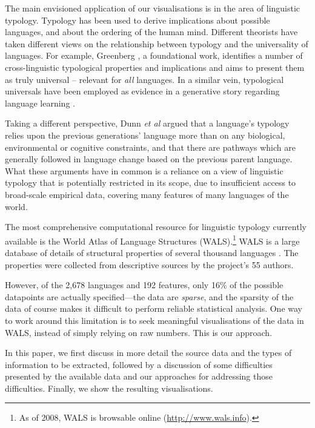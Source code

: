\documentclass[11pt]{article}
\begin{document}
The main envisioned application of our visualisations is in the area of linguistic typology. Typology has been used to derive implications about possible languages, and about the ordering of the human mind. Different theorists have taken different views on the relationship between typology and the universality of languages. For example, Greenberg , a foundational work, identifies a number of cross-linguistic typological properties and implications and aims to present them as truly universal -- relevant for \textit{all} languages. In a similar vein, typological universals have been employed as evidence in a generative story regarding language learning \cite{chomsky}.

Taking a different perspective, Dunn {\it et al}  argued that a language's typology relies upon the previous generations' language more than on any biological, environmental or cognitive constraints, and that there are pathways which are generally followed in language change based on the previous parent language. What these arguments have in common is a reliance on a view of linguistic typology that is potentially restricted in its scope, due to insufficient access to broad-scale empirical data, covering many features of many languages of the world. 

The most comprehensive computational resource for linguistic typology currently available is the World Atlas of Language Structures (WALS).\footnote{As of 2008, WALS is browsable online (\url{http://www.wals.info}).}  WALS is a large database of details of structural properties of several thousand languages \cite{wals-2011}. The properties were collected from descriptive sources by the project's 55 authors.

However, of the 2,678 languages and 192 features, only 16\% of the possible datapoints are actually specified---the data are \emph{sparse}, and the sparsity of the data of course makes it difficult to perform reliable statistical analysis. One way to work around this limitation is to seek meaningful visualisations of the data in WALS, instead of simply relying on raw numbers. This is our approach. 

In this paper, we first discuss in more detail the source data and the types of information to be extracted, followed by a discussion of some difficulties presented by the available data and our approaches for addressing those difficulties. Finally, we show the resulting visualisations.
\end{document}
